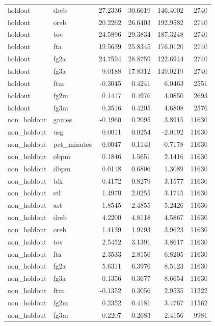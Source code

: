 \begin{table}
\begin{tabular}{llrrrr}
holdout & dreb & 27.2336 & 30.6619 & 146.4002 & 2740 \\
holdout & oreb & 20.2262 & 26.6403 & 192.9582 & 2740 \\
holdout & tov & 24.5896 & 29.3834 & 187.3248 & 2740 \\
holdout & fta & 19.5639 & 25.8345 & 176.0120 & 2740 \\
holdout & fg2a & 24.7594 & 28.8759 & 122.6944 & 2740 \\
holdout & fg3a & 9.0188 & 17.8312 & 149.0219 & 2740 \\
holdout & ftm & -0.3045 & 0.4241 & 6.0463 & 2551 \\
holdout & fg2m & 0.1417 & 0.4976 & 4.0850 & 2693 \\
holdout & fg3m & 0.3516 & 0.4205 & 4.6808 & 2576 \\
non\_holdout & games & -0.1960 & 0.2095 & 3.8915 & 11630 \\
non\_holdout & usg & 0.0011 & 0.0254 & -2.0192 & 11630 \\
non\_holdout & pct\_minutes & 0.0047 & 0.1143 & -0.7178 & 11630 \\
non\_holdout & obpm & 0.1846 & 1.5651 & 2.1416 & 11630 \\
non\_holdout & dbpm & 0.0118 & 0.6806 & 1.3089 & 11630 \\
non\_holdout & blk & 0.4172 & 0.8279 & 3.1577 & 11630 \\
non\_holdout & stl & 1.4970 & 2.0255 & 3.1745 & 11630 \\
non\_holdout & ast & 1.8545 & 2.4855 & 5.2426 & 11630 \\
non\_holdout & dreb & 4.2200 & 4.8118 & 4.5867 & 11630 \\
non\_holdout & oreb & 1.4139 & 1.9793 & 3.9623 & 11630 \\
non\_holdout & tov & 2.5452 & 3.1391 & 3.8617 & 11630 \\
non\_holdout & fta & 2.3533 & 2.8156 & 6.8205 & 11630 \\
non\_holdout & fg2a & 5.6311 & 6.3976 & 8.5123 & 11630 \\
non\_holdout & fg3a & 0.1356 & 0.3677 & 8.6654 & 11630 \\
non\_holdout & ftm & -0.1352 & 0.3056 & 2.9535 & 11222 \\
non\_holdout & fg2m & 0.2352 & 0.4181 & 3.4767 & 11562 \\
non\_holdout & fg3m & 0.2207 & 0.2683 & 2.4156 & 9981 \\
\bottomrule
\end{tabular}
\end{table}
